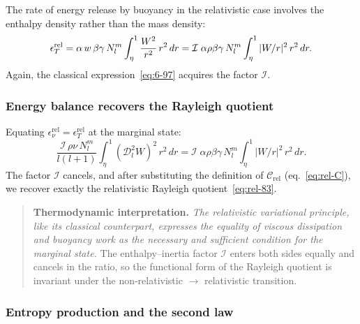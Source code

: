 The rate of energy release by buoyancy in the relativistic case
involves the enthalpy density rather than the mass density:
\begin{equation}
  \epsilon_{T}^{\mathrm{rel}}
  = \alpha\,w\,\beta\gamma\,N_{l}^{m}
    \int_{\eta}^{1}\frac{W^{2}}{r^{2}}\,r^{2}\,dr
  = \mathcal{I}\;\alpha\rho\beta\gamma\,N_{l}^{m}
    \int_{\eta}^{1}|W/r|^{2}\,r^{2}\,dr.
  \label{eq:rel-97}
\end{equation}
Again, the classical expression~\eqref{eq:6-97} acquires the factor
$\mathcal{I}$.

\subsubsection{Energy balance recovers the Rayleigh quotient}
\label{sec:rel-58-balance}

Equating $\epsilon_{\nu}^{\mathrm{rel}} =
\epsilon_{T}^{\mathrm{rel}}$ at the marginal state:
\begin{equation}
  \frac{\mathcal{I}\,\rho\nu\,N_{l}^{m}}{l(l+1)}
    \int_{\eta}^{1}(\mathscr{D}_{l}^{2}W)^{2}\,r^{2}\,dr
  = \mathcal{I}\;\alpha\rho\beta\gamma\,N_{l}^{m}
    \int_{\eta}^{1}|W/r|^{2}\,r^{2}\,dr.
  \label{eq:rel-balance}
\end{equation}
The factor $\mathcal{I}$ cancels, and after substituting the definition
of $\mathcal{C}_{\mathrm{rel}}$ (eq.~\eqref{eq:rel-C}), we recover
exactly the relativistic Rayleigh quotient~\eqref{eq:rel-83}.

\begin{quote}
\textbf{Thermodynamic interpretation.}  \emph{The relativistic
variational principle, like its classical counterpart, expresses the
equality of viscous dissipation and buoyancy work as the necessary and
sufficient condition for the marginal state.}  The enthalpy--inertia
factor $\mathcal{I}$ enters both sides equally and cancels in the
ratio, so the functional form of the Rayleigh quotient is invariant
under the non-relativistic $\to$ relativistic transition.
\end{quote}

\subsubsection{Entropy production and the second law}
\label{sec:rel-58-entropy}

